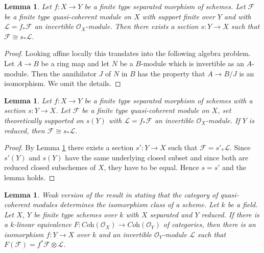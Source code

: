 \documentclass{stacks-project}
\newenvironment{reference}{\comment}{\endcomment}
\theoremstyle{plain}
\newtheorem{lemma}[subsection]{Lemma}
\theoremstyle{definition}
\theoremstyle{remark}
\numberwithin{equation}{subsection}
\begin{document}
\begin{lemma}
\label{lemma-pushforward-invertible-pre}
Let $f : X \to Y$ be a finite type separated morphism of schemes. Let
$\mathcal{F}$ be a finite type quasi-coherent module on $X$
with support finite over $Y$
and with $\mathcal{L} = f_*\mathcal{F}$ an invertible $\mathcal{O}_X$-module.
Then there exists a section $s : Y \to X$ such that
$\mathcal{F} \cong s_*\mathcal{L}$.
\end{lemma}

\begin{proof}
Looking affine locally this translates into the following algebra problem.
Let $A \to B$ be a ring map and let $N$ be a $B$-module which is
invertible as an $A$-module. Then the annihilator $J$ of $N$ in $B$
has the property that $A \to B/J$ is an isomorphism. We omit the details.
\end{proof}

\begin{lemma}
\label{lemma-pushforward-invertible}
Let $f : X \to Y$ be a finite type separated morphism of schemes with a section
$s : Y \to X$. Let $\mathcal{F}$ be a finite type quasi-coherent module
on $X$, set theoretically supported on $s(Y)$ with
$\mathcal{L} = f_*\mathcal{F}$
an invertible $\mathcal{O}_X$-module. If $Y$ is reduced, then
$\mathcal{F} \cong s_*\mathcal{L}$.
\end{lemma}

\begin{proof}
By Lemma \ref{lemma-pushforward-invertible-pre}
there exists a section $s' : Y  \to X$ such that
$\mathcal{F} = s'_*\mathcal{L}$. Since $s'(Y)$ and $s(Y)$
have the same underlying closed subset
and since both are reduced closed subschemes of $X$, they have to be equal.
Hence $s = s'$ and the lemma holds.
\end{proof}

\begin{lemma}
\label{lemma-equivalence-coherent-over-field}
\begin{reference}
Weak version of the result in \cite{Gabriel}
stating that the category of quasi-coherent modules
determines the isomorphism class of a scheme.
\end{reference}
Let $k$ be a field. Let $X$, $Y$ be finite type schemes over $k$ with
$X$ separated and $Y$ reduced. If there is a $k$-linear equivalence
$F : \textit{Coh}(\mathcal{O}_X) \to \textit{Coh}(\mathcal{O}_Y)$
of categories, then there is an isomorphism $f : Y \to X$
over $k$ and an invertible $\mathcal{O}_Y$-module $\mathcal{L}$
such that $F(\mathcal{F}) = f^*\mathcal{F} \otimes \mathcal{L}$.
\end{lemma}
\end{document}
